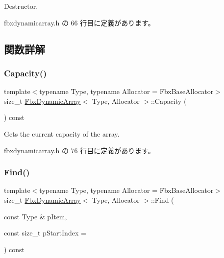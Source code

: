 Destructor. 



 fbxdynamicarray.\+h の 66 行目に定義があります。



\subsection{関数詳解}
\mbox{\label{class_fbx_dynamic_array_a148f92f13097c3dac6e947880fd978e5}} 
\subsubsection{\texorpdfstring{Capacity()}{Capacity()}}
{\footnotesize\ttfamily template$<$typename Type, typename Allocator = Fbx\+Base\+Allocator$>$ \\
size\+\_\+t \hyperlink{class_fbx_dynamic_array}{Fbx\+Dynamic\+Array}$<$ Type, Allocator $>$\+::Capacity (\begin{DoxyParamCaption}{ }\end{DoxyParamCaption}) const\hspace{0.3cm}{\ttfamily [inline]}}



Gets the current capacity of the array. 



 fbxdynamicarray.\+h の 76 行目に定義があります。

\mbox{\label{class_fbx_dynamic_array_a9fc0e6555886f0e38cd7f5027ed2b6a0}} 
\subsubsection{\texorpdfstring{Find()}{Find()}}
{\footnotesize\ttfamily template$<$typename Type, typename Allocator = Fbx\+Base\+Allocator$>$ \\
size\+\_\+t \hyperlink{class_fbx_dynamic_array}{Fbx\+Dynamic\+Array}$<$ Type, Allocator $>$\+::Find (\begin{DoxyParamCaption}\item[{const Type \&}]{p\+Item,  }\item[{const size\+\_\+t}]{p\+Start\+Index = {} }\end{DoxyParamCaption}) const\hspace{0.3cm}{\ttfamily [inline]}}

